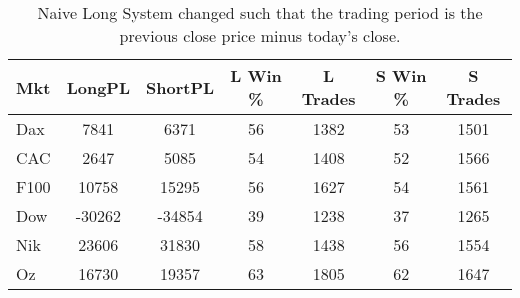 \begin{table}[ht]
\centering
\caption[Naive Long System - Close to Close]{Naive Long System changed such that the trading period is the previous close price minus today's close.} 
\label{tab:q_90_results}
\begin{tabular}{lcccccc}
  \toprule Mkt & LongPL & ShortPL & L Win \% & L Trades & S Win \% & S Trades \\ 
  \midrule Dax & 7841 & 6371 & 56 & 1382 & 53 & 1501 \\ 
  CAC & 2647 & 5085 & 54 & 1408 & 52 & 1566 \\ 
  F100 & 10758 & 15295 & 56 & 1627 & 54 & 1561 \\ 
  Dow & -30262 & -34854 & 39 & 1238 & 37 & 1265 \\ 
  Nik & 23606 & 31830 & 58 & 1438 & 56 & 1554 \\ 
  Oz & 16730 & 19357 & 63 & 1805 & 62 & 1647 \\ 
   \bottomrule \end{tabular}
\end{table}
